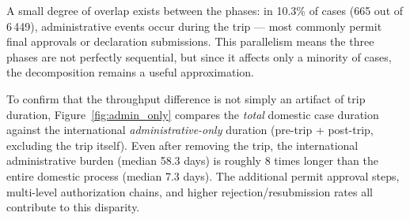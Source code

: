 \documentclass[11pt,a4paper]{article}
\begin{document}
A small degree of overlap exists between the phases: in 10.3\% of cases (665 out of 6\,449), administrative events occur during the trip — most commonly permit final approvals or declaration submissions. This parallelism means the three phases are not perfectly sequential, but since it affects only a minority of cases, the decomposition remains a useful approximation.

To confirm that the throughput difference is not simply an artifact of trip duration, Figure~\ref{fig:admin_only} compares the \emph{total} domestic case duration against the international \emph{administrative-only} duration (pre-trip + post-trip, excluding the trip itself). Even after removing the trip, the international administrative burden (median 58.3 days) is roughly 8 times longer than the entire domestic process (median 7.3 days). The additional permit approval steps, multi-level authorization chains, and higher rejection/resubmission rates all contribute to this disparity.
\end{document}
